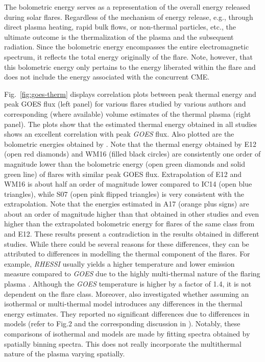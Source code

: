 The bolometric energy serves as a representation of the overall energy released during solar flares. Regardless of the mechanism of energy release, e.g., through direct plasma heating, rapid bulk flows, or non-thermal particles, etc., the ultimate outcome is the thermalization of the plasma and the subsequent radiation. Since the bolometric energy encompasses the entire electromagnetic spectrum, it reflects the total energy originally of the flare. Note, however, that this bolometric energy only pertains to the energy liberated within the flare and does not include the energy associated with the concurrent CME. %

Fig.~\ref{fig:goes-therm} displays correlation plots between peak thermal energy and peak GOES flux (left panel) for various flares studied by various authors and corresponding (where available) volume estimates of the thermal plasma (right panel). The plots show that the estimated thermal energy obtained in all studies shows an excellent correlation with peak {\it GOES} flux. Also plotted are the bolometric energies obtained by \cite{emslie12, kretzschmar11}. %
Note that the thermal energy obtained by E12 (open red diamonds) and WM16 (filled black circles) are consistently one order of magnitude lower than the bolometric energy (open green diamonds and solid green line) of flares with similar peak GOES flux. Extrapolation of E12 and WM16 is about half an order of magnitude lower compared to IC14 (open blue triangles), while S07 (open pink flipped triangles) is very consistent with the extrapolation. Note that the energies estimated in A17 (orange plus signs) are about an order of magnitude higher than that obtained in other studies and even higher than the extrapolated bolometric energy for flares of the same class from \cite{kretzschmar11} and E12. These results present a contradiction in the results obtained in different studies. While there could be several reasons for these differences, they can be attributed to differences in modelling the thermal component of the flares. For example, {\it RHESSI} usually yields a higher temperature and lower emission measure compared to {\it GOES} due to the highly multi-thermal nature of the flaring plasma \citep{bataglia05,ryan14,warmuth16a}. Although the {\it GOES} temperature is higher by a factor of 1.4, it is not dependent on the flare class. Moreover, \cite{warmuth20} also investigated whether assuming an isothermal or multi-thermal model introduces any differences in the thermal energy estimates. They reported no significant differences due to differences in models (refer to Fig.2 and the corresponding discussion in \cite{warmuth20}). Notably, these comparisons of isothermal and models are made by fitting spectra obtained by spatially binning spectra. This does not really incorporate the multithermal nature of the plasma varying spatially.

